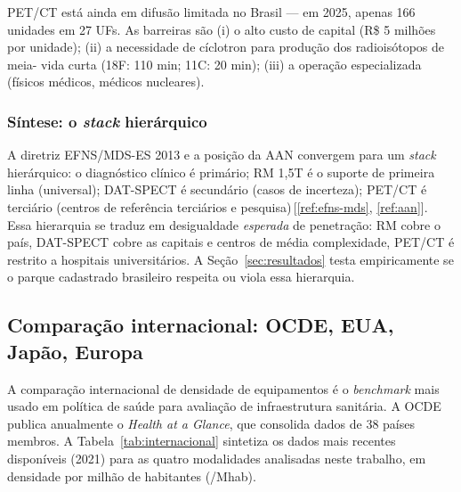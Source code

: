 \documentclass[12pt,a4paper,oneside]{article}
\begin{document}
PET/CT está ainda em difusão limitada no Brasil — em 2025, apenas
166 unidades em 27 UFs. As barreiras são (i) o alto custo de
capital (R\$ 5 milhões por unidade); (ii) a
necessidade de cíclotron para produção dos radioisótopos de meia-
vida curta (18F: 110 min; 11C: 20 min); (iii) a operação
especializada (físicos médicos, médicos nucleares).

\subsubsection{Síntese: o \textit{stack} hierárquico}

A diretriz EFNS/MDS-ES 2013 e a posição da AAN convergem para um
\textit{stack} hierárquico: o diagnóstico clínico é primário; RM
1,5T é o suporte de primeira linha (universal); DAT-SPECT é
secundário (casos de incerteza); PET/CT é terciário (centros de
referência terciários e pesquisa)\,[\ref{ref:efns-mds},
\ref{ref:aan}]. Essa hierarquia se traduz em desigualdade
\textit{esperada} de penetração: RM cobre o país, DAT-SPECT cobre as
capitais e centros de média complexidade, PET/CT é restrito a
hospitais universitários. A Seção~\ref{sec:resultados} testa
empiricamente se o parque cadastrado brasileiro respeita ou viola
essa hierarquia.

\subsection{Comparação internacional: OCDE, EUA, Japão, Europa}\label{subsec:internacional}

A comparação internacional de densidade de equipamentos é o
\textit{benchmark} mais usado em política de saúde para avaliação de
infraestrutura sanitária. A OCDE publica anualmente o \textit{Health at
a Glance}, que consolida dados de 38 países membros. A
Tabela~\ref{tab:internacional} sintetiza os dados mais recentes
disponíveis (2021) para as quatro modalidades
analisadas neste trabalho, em densidade por milhão de habitantes
(/Mhab).
\end{document}
